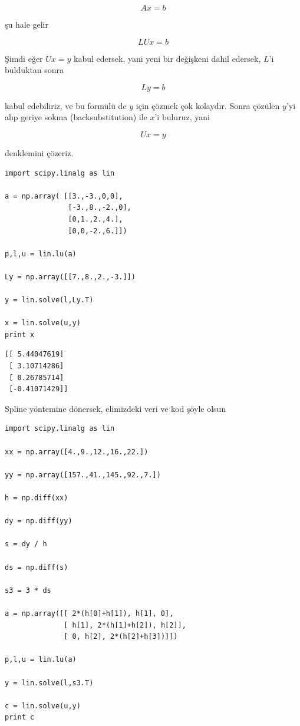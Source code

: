 \documentclass[12pt,fleqn]{article}\usepackage{../../common}
\begin{document}
$$ Ax = b $$

şu hale gelir

$$ LUx = b $$

Şimdi eğer $Ux = y$ kabul edersek, yani yeni bir değişkeni dahil edersek,
$L$'i bulduktan sonra

$$ Ly = b $$

kabul edebiliriz, ve bu formülü de $y$ için çözmek çok kolaydır. Sonra
çözülen $y$'yi alıp geriye sokma (backsubstitution) ile $x$'i buluruz, yani 

$$ Ux = y $$ 

denklemini çözeriz. 

\begin{verbatim}
import scipy.linalg as lin

a = np.array( [[3.,-3.,0,0],
               [-3.,8.,-2.,0],
               [0,1.,2.,4.],
               [0,0,-2.,6.]])

p,l,u = lin.lu(a)

Ly = np.array([[7.,8.,2.,-3.]])

y = lin.solve(l,Ly.T)

x = lin.solve(u,y)
print x
\end{verbatim}

\begin{verbatim}
[[ 5.44047619]
 [ 3.10714286]
 [ 0.26785714]
 [-0.41071429]]
\end{verbatim}

Spline yöntemine dönersek, elimizdeki veri ve kod şöyle olsun

\begin{verbatim}
import scipy.linalg as lin

xx = np.array([4.,9.,12.,16.,22.])

yy = np.array([157.,41.,145.,92.,7.])

h = np.diff(xx)

dy = np.diff(yy)

s = dy / h

ds = np.diff(s)

s3 = 3 * ds

a = np.array([[ 2*(h[0]+h[1]), h[1], 0],
              [ h[1], 2*(h[1]+h[2]), h[2]],
              [ 0, h[2], 2*(h[2]+h[3])]])

p,l,u = lin.lu(a)

y = lin.solve(l,s3.T)

c = lin.solve(u,y)
print c
\end{verbatim}
\end{document}
